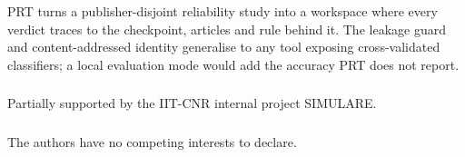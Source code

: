 \documentclass[runningheads]{llncs}
\begin{document}
PRT turns a publisher-disjoint reliability study into a workspace where every
verdict traces to the checkpoint, articles and rule behind it. The leakage guard
and content-addressed identity generalise to any tool exposing cross-validated
classifiers; a local evaluation mode would add the accuracy PRT does not report.

\begin{credits}
\subsubsection{\ackname}
Partially supported by the IIT-CNR internal project SIMULARE.

\subsubsection{\discintname}
The authors have no competing interests to declare.
\end{credits}



\end{document}

